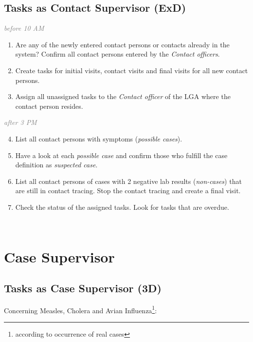 \documentclass[a4paper, titlepage]{tufte-handout}
\begin{document}
\newpage
\subsection{Tasks as Contact Supervisor (ExD)}
\label{sec-6-4}

\emph{\textcolor{gray}{before 10 AM}}

\begin{enumerate}
\item Are any of the newly entered contact persons or contacts already in the system? Confirm all contact persons entered by the \emph{Contact officers}.

\item Create tasks for initial visits, contact visits and final visits for all new contact persons.

\item Assign all unassigned tasks to the \emph{Contact officer} of the LGA where the contact person resides.
\end{enumerate}

\emph{\textcolor{gray}{after 3 PM}}

\begin{enumerate}
\setcounter{enumi}{3}
\item List all contact persons with symptoms (\emph{possible cases}).

\item Have a look at each \emph{possible case} and confirm those who fulfill the case definition as \emph{suspected case}.

\item List all contact persons of cases with 2 negative lab results (\emph{non-cases}) that are still in contact tracing. Stop the contact tracing and create a final visit.

\item Check the status of the assigned tasks. Look for tasks that are overdue.
\end{enumerate}
 

\section{Case Supervisor}
\label{sec-7}

\subsection{Tasks as Case Supervisor (3D)}
\label{sec-7-1}

Concerning Measles, Cholera and Avian Influenza\footnote{according to occurrence of real cases}:
\end{document}
